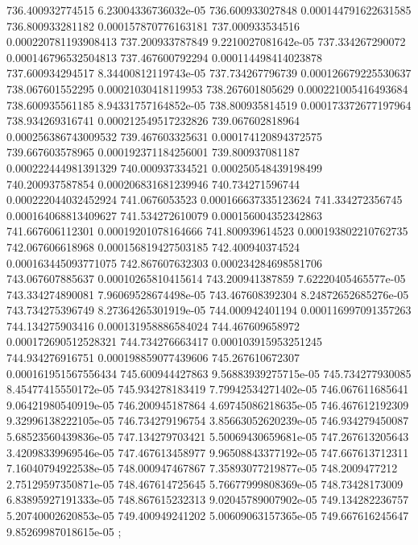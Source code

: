 {736.400932774515 6.23004336736032e-05
736.600933027848 0.000144791622631585
736.800933281182 0.000157870776163181
737.000933534516 0.000220781193908413
737.200933787849 9.2210027081642e-05
737.334267290072 0.000146796532504813
737.467600792294 0.000114498414023878
737.600934294517 8.34400812119743e-05
737.734267796739 0.000126679225530637
738.067601552295 0.00021030418119953
738.267601805629 0.000221005416493684
738.600935561185 8.94331757164852e-05
738.800935814519 0.000173372677197964
738.934269316741 0.000212549517232826
739.067602818964 0.000256386743009532
739.467603325631 0.000174120894372575
739.667603578965 0.000192371184256001
739.800937081187 0.000222444981391329
740.000937334521 0.000250548439198499
740.200937587854 0.000206831681239946
740.734271596744 0.000222044032452924
741.0676053523 0.000166637335123624
741.334272356745 0.000164068813409627
741.534272610079 0.000156004352342863
741.667606112301 0.00019201078164666
741.800939614523 0.000193802210762735
742.067606618968 0.000156819427503185
742.400940374524 0.000163445093771075
742.867607632303 0.000234284698581706
743.067607885637 0.00010265810415614
743.200941387859 7.62220405465577e-05
743.334274890081 7.96069528674498e-05
743.467608392304 8.24872652685276e-05
743.734275396749 8.27364265301919e-05
744.000942401194 0.000116997091357263
744.134275903416 0.000131958886584024
744.467609658972 0.000172690512528321
744.734276663417 0.000103915953251245
744.934276916751 0.000198859077439606
745.267610672307 0.000161951567556434
745.600944427863 9.56883939275715e-05
745.734277930085 8.45477415550172e-05
745.934278183419 7.79942534271402e-05
746.067611685641 9.06421980540919e-05
746.200945187864 4.69745086218635e-05
746.467612192309 9.32996138222105e-05
746.734279196754 3.85663052620239e-05
746.934279450087 5.68523560439836e-05
747.134279703421 5.50069430659681e-05
747.267613205643 3.42098339969546e-05
747.467613458977 9.96508843377192e-05
747.667613712311 7.16040794922538e-05
748.000947467867 7.35893077219877e-05
748.2009477212 2.75129597350871e-05
748.467614725645 5.76677999808369e-05
748.73428173009 6.83895927191333e-05
748.867615232313 9.02045789007902e-05
749.134282236757 5.20740002620853e-05
749.400949241202 5.00609063157365e-05
749.667616245647 9.85269987018615e-05
};